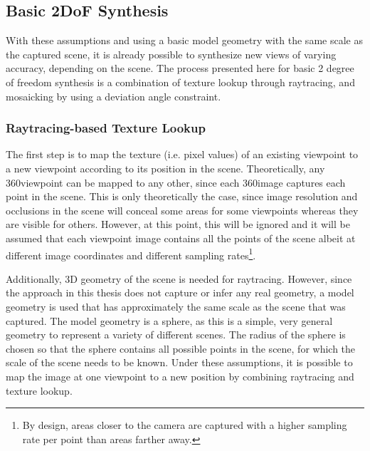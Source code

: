 \subsection{Basic 2DoF Synthesis}
With these assumptions and using a basic model geometry with the same scale as the captured scene, it is already possible to synthesize new views of varying accuracy, depending on the scene. The process presented here for basic 2 degree of freedom synthesis is a combination of texture lookup through raytracing, and mosaicking by using a deviation angle constraint.

\subsubsection{Raytracing-based Texture Lookup}
The first step is to map the texture (i.e. pixel values) of an existing viewpoint to a new viewpoint according to its position in the scene. Theoretically, any 360\degree viewpoint can be mapped to any other, since each 360\degree image captures each point in the scene. This is only theoretically the case, since image resolution and occlusions in the scene will conceal some areas for some viewpoints whereas they are visible for others. However, at this point, this will be ignored and it will be assumed that each viewpoint image contains all the points of the scene albeit at different image coordinates and different sampling rates\footnote{By design, areas closer to the camera are captured with a higher sampling rate per point than areas farther away.}. 

Additionally, 3D geometry of the scene is needed for raytracing. However, since the approach in this thesis does not capture or infer any real geometry, a model geometry is used that has approximately the same scale as the scene that was captured. The model geometry is a sphere, as this is a simple, very general geometry to represent a variety of different scenes. The radius of the sphere is chosen so that the sphere contains all possible points in the scene, for which the scale of the scene needs to be known. Under these assumptions, it is possible to map the image at one viewpoint to a new position by combining raytracing and texture lookup.


